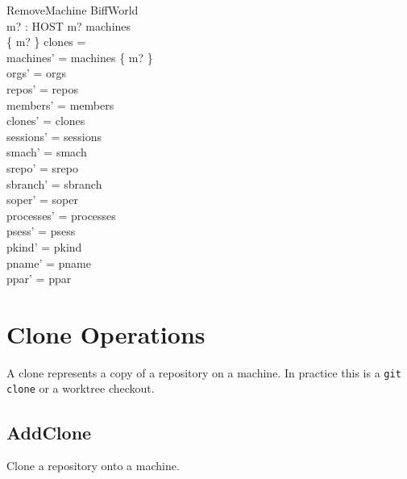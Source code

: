 \documentclass[a4paper,10pt,fleqn]{article}
\begin{document}
\begin{schema}{RemoveMachine}
  \Delta BiffWorld \\
  m? : HOST
  \where
  m? \in machines \\
  \{ m? \} \dres clones = \emptyset \\
  machines' = machines \setminus \{ m? \} \\
  orgs' = orgs \\
  repos' = repos \\
  members' = members \\
  clones' = clones \\
  sessions' = sessions \\
  smach' = smach \\
  srepo' = srepo \\
  sbranch' = sbranch \\
  soper' = soper \\
  processes' = processes \\
  psess' = psess \\
  pkind' = pkind \\
  pname' = pname \\
  ppar' = ppar
\end{schema}

\section{Clone Operations}

A clone represents a copy of a repository on a machine.  In practice
this is a \texttt{git clone} or a worktree checkout.

\subsection{AddClone}

Clone a repository onto a machine.
\end{document}
